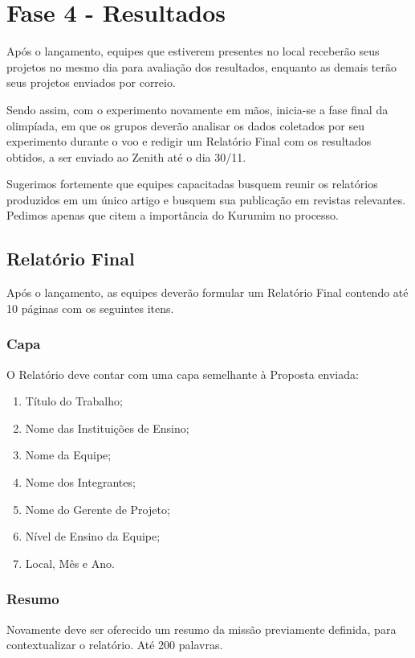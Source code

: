 \section{Fase 4 - Resultados}
    Após o lançamento, equipes que estiverem presentes no local receberão seus projetos 
    no mesmo dia para avaliação dos resultados, enquanto as demais terão seus projetos 
    enviados por correio.

    Sendo assim, com o experimento novamente em mãos, inicia-se a fase final da olimpíada,
    em que os grupos deverão analisar os dados coletados por seu experimento durante o voo 
    e redigir um Relatório Final com os resultados obtidos, a ser enviado ao Zenith até o 
    dia 30/11.

    Sugerimos fortemente que equipes capacitadas busquem reunir os relatórios produzidos em
    um único artigo e busquem sua publicação em revistas relevantes. Pedimos apenas que 
    citem a importância do Kurumim no processo.
    
    \subsection{Relatório Final}
        Após o lançamento, as equipes deverão formular um Relatório Final contendo até 
        10 páginas com os seguintes itens.

        \subsubsection{Capa}
            O Relatório deve contar com uma capa semelhante à Proposta enviada:
            \begin{enumerate}
                \item Título do Trabalho; 
                \item Nome das Instituições de Ensino; 
                \item Nome da Equipe; 
                \item Nome dos Integrantes; 
                \item Nome do Gerente de Projeto;
                \item Nível de Ensino da Equipe;
                \item Local, Mês e Ano. 
            \end{enumerate}
            
        \subsubsection{Resumo}
            Novamente deve ser oferecido um resumo da missão previamente definida, para contextualizar o relatório. Até 200 palavras.
        
